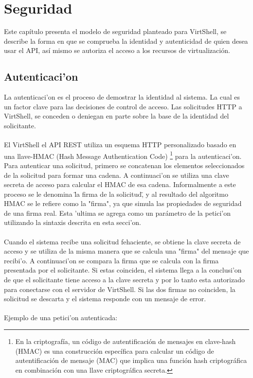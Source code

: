 \chapter{Seguridad}
\label{capseguridad}

Este capítulo presenta el modelo de seguridad planteado para VirtShell, se describe la forma en que se comprueba la identidad y autenticidad de quien desea usar el API, así mismo se autoriza el acceso a los recursos de virtualización.

\section{Autenticaci'on}
La autenticaci'on es el proceso de demostrar la identidad al sistema. La cual es un factor clave para las decisiones de control de acceso. Las solicitudes HTTP a VirtShell, se conceden o deniegan en parte sobre la base de la identidad del solicitante.\\
\\
El VirtShell el API REST utiliza un esquema HTTP personalizado basado en una llave-HMAC (Hash Message Authentication Code) \footnote{En la criptografía, un código de autentificación de mensajes en clave-hash (HMAC) es una construcción específica para calcular un código de autentificación de mensaje (MAC) que implica una función hash criptográfica en combinación con una llave criptográfica secreta.} para la autenticaci'on. Para autenticar una solicitud, primero se concatenan los elementos seleccionados de la solicitud para formar una cadena. A continuaci'on se utiliza una clave secreta de acceso para calcular el HMAC de esa cadena. Informalmente a este proceso se le denomina \"la firma de la solicitud\", y al resultado del algoritmo HMAC se le refiere como la "firma", ya que simula las propiedades de seguridad de una firma real. Esta 'ultima se agrega como un parámetro de la petici'on utilizando la sintaxis descrita en esta secci'on.\\
\\
Cuando el sistema recibe una solicitud fehaciente, se obtiene la clave secreta de acceso y se utiliza de la misma manera que se calcula una "firma" del mensaje que recibi'o. A continuaci'on se compara la firma que se calcula con la firma presentada por el solicitante. Si estas coinciden, el sistema llega a la conclusi'on de que el solicitante tiene acceso a la clave secreta y por lo tanto esta autorizado para conectarse con el servidor de VirtShell. Si las dos firmas no coinciden, la solicitud se descarta y el sistema responde con un mensaje de error.\\
\\
Ejemplo de una petici'on autenticada:

